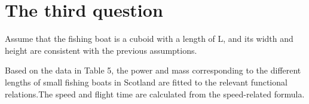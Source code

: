 \documentclass{mcmthesis}
\begin{document}
  \begin{figure}[h]
    \centering
    
    \centering
    \caption{}
  \end{figure}
  
\section{The third question}

Assume that the fishing boat is a cuboid with a length of L, and its width and height are consistent with the previous assumptions.

Based on the data in Table 5, the power and mass corresponding to the different lengths of small fishing boats in Scotland are fitted to the relevant functional relations.The speed and flight time are calculated from the speed-related formula.
\end{document}
